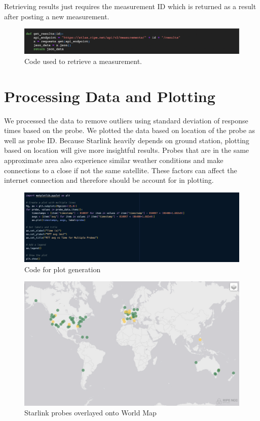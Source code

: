 \documentclass[acmsmall]{acmart}
\begin{document}
Retrieving results just requires the measurement ID which is returned as a result after posting a new measurement.

\begin{figure}[h]
  \centering
  \includegraphics[width=\linewidth]{getresults.png}
  \caption{Code used to retrieve a measurement.}
\end{figure}


\section{Processing Data and Plotting}

We processed the data to remove outliers using standard deviation of response times based on the probe. We plotted the data based on location of the probe as well as probe ID. Because Starlink heavily depends on ground station, plotting based on location will give more insightful results. Probes that are in the same approximate area also experience similar weather conditions and make connections to a close if not the same satellite. These factors can affect the internet connection and therefore should be account for in plotting.

\begin{figure}[h]
  \centering
  \includegraphics[width=\linewidth]{plot_code.png}
  \caption{Code for plot generation}
  \Description{ }
\end{figure}

\begin{figure}[h]
  \centering
  \includegraphics[width=\linewidth]{starlink_probes.png}
  \caption{Starlink probes overlayed onto World Map}
\end{figure}
\end{document}
